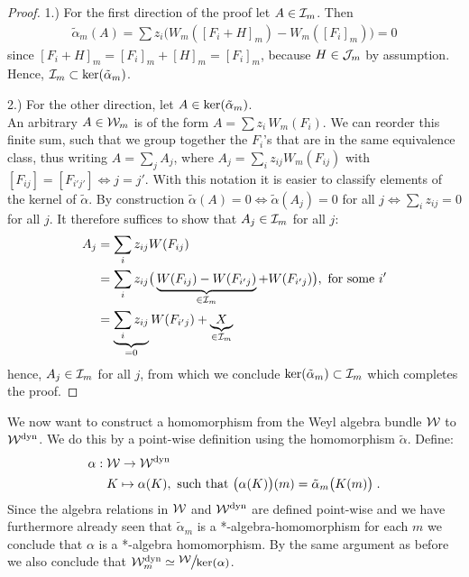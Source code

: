 	\begin{proof}
1.) For the first direction of the proof let $A \in \mathcal{I}_m$. Then
\begin{align}
	\tilde{\alpha}_m(A) = \sum z_i  \big( W_m([F_i + H]_m ) - W_m([F_i]_m)\big)
	=0
\end{align}
since $[F_i + H]_m = [F_i]_m + [H]_m = [F_i]_m$, because $H \in \mathcal{J}_m$ by assumption. Hence, $\mathcal{I}_m \subset \mathrm{ker}{}(\tilde{\alpha}_m)$. \par 
2.) For the other direction, let $A \in \mathrm{ker}{}(\tilde{\alpha}_m)$. \\
An arbitrary $A \in \mathcal{W}_m$ is of the form $A = \sum z_i \, W_m(F_i)$. We can reorder this finite sum, such that we group together the $F_i$'s that are in the same equivalence class, thus writing $A = \sum_j A_j$, where $A_j = \sum_i z_{ij} W_m(F_{ij})$ with $[F_{ij}] = [F_{i'j'}] \iff j=j'$. With this notation it is easier to classify elements of the kernel of $\tilde{\alpha}$. By construction $\tilde{\alpha}(A) = 0 \iff \tilde{\alpha}(A_j) =0$ for all $j \iff \sum_i z_{ij} = 0$ for all $j$. It therefore suffices to show that $A_j \in \mathcal{I}_m$ for all $j$:
\begin{align}
	A_j 
	&= \sum_i z_{ij} W(F_{ij})  \notag\\		
	&= \sum_i z_{ij} \big( \underbrace{W(F_{ij}) - W(F_{i'j})}_{\in \mathcal{I}_m} +W(F_{i'j}) \big) , \text{ for some }i' \notag \\
	&= \underbrace{\sum_i z_{ij}}_{=0}  W(F_{i'j}) + \underbrace{X}_{\in \mathcal{I}_m}
\end{align}
hence, $A_j \in \mathcal{I}_m$ for all $j$, from which we conclude $\mathrm{ker}{}(\tilde{\alpha}_m) \subset \mathcal{I}_m$ which completes the proof. 
	\end{proof}
%
%
%
%
We now want to construct a homomorphism from the Weyl algebra bundle $\mathcal{W}$ to $\mathcal{W}^\text{dyn}$. We do this by a point-wise definition using the homomorphism $\tilde{\alpha}$. 
Define:
\begin{align}
	\alpha : \;&\mathcal{W} \to \mathcal{W}^\text{dyn}  \\
	& K \mapsto \alpha(K), \text{ such that }\big(  \alpha(K) \big) (m) = \tilde{\alpha}_m \big( K(m)\big) \;. \notag
\end{align}
Since the algebra relations in $\mathcal{W}$ and $\mathcal{W}^\text{dyn}$ are defined point-wise and we have furthermore already seen that $\tilde{\alpha}_m$ is a *-algebra-homomorphism for each $m$ we conclude that $\alpha$ is a *-algebra homomorphism. By the same argument as before we also conclude that $\Wmdyn \simeq {\Quotientscale{\W}{\Ker{\alpha}}}$.\par 

